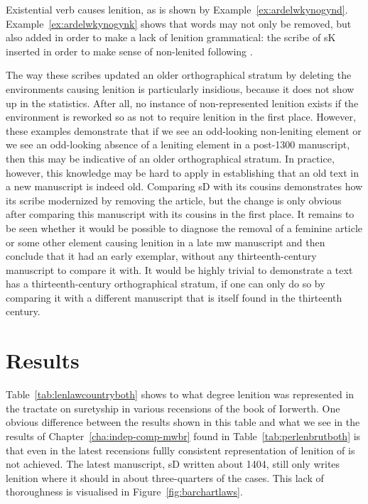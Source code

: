 Existential verb  causes lenition, as is shown by Example~\ref{ex:ardelwkynogynd}. Example~\ref{ex:ardelwkynogynk} shows that words may not only be removed, but also added in order to make a lack of lenition grammatical: the scribe of \gls{sK} inserted  in order to make sense of non-lenited  following .
\begin{mwl}
\end{mwl}
The way these scribes updated an older orthographical stratum by  deleting the environments causing lenition is particularly insidious, because it does not show up in the statistics. After all, no instance of non-represented lenition exists if the environment is reworked so as not to require lenition in the first place. However, these examples demonstrate that if we see an odd-looking non-leniting element or we see an odd-looking absence of a leniting element in a post-1300 manuscript, then this may be indicative of an older orthographical stratum. In practice, however, this knowledge may be hard to apply in establishing that an old text in a new manuscript is indeed old. Comparing \gls{sD} with its cousins demonstrates how its scribe modernized by removing the article, but  the change is only obvious after comparing this manuscript with  its cousins in the first place. It remains to be seen whether it would be possible to diagnose the removal of a feminine article or some other element causing lenition in a late \gls{mw} manuscript and then conclude that it had an early exemplar, without any thirteenth-century manuscript to compare it with. It would be highly trivial to demonstrate a text has a thirteenth-century orthographical stratum, if one can only do so by comparing it with a different manuscript that is itself found in the thirteenth century.
\section{Results}
\label{sec:results}

Table~\ref{tab:lenlawcountryboth} shows to what degree lenition was represented in the tractate on suretyship in various recensions of the book of Iorwerth. One obvious difference between the results shown in this table and what we see in the results  of Chapter~\ref{cha:indep-comp-mwbr} found in Table~\ref{tab:perlenbrutboth} is that even in the latest recensions fullly consistent representation of  lenition of  is not achieved. The latest manuscript, \gls{sD} written about 1404, still only writes lenition where it should in about three-quarters of the cases. This lack of thoroughness is visualised in Figure~\ref{fig:barchartlaws}.

